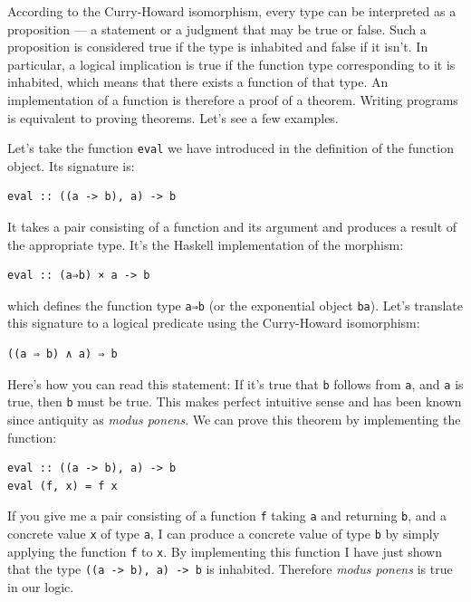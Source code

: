 According to the Curry-Howard isomorphism, every type can be interpreted
as a proposition --- a statement or a judgment that may be true or
false. Such a proposition is considered true if the type is inhabited
and false if it isn't. In particular, a logical implication is true if
the function type corresponding to it is inhabited, which means that
there exists a function of that type. An implementation of a function is
therefore a proof of a theorem. Writing programs is equivalent to
proving theorems. Let's see a few examples.

Let's take the function \texttt{eval} we have introduced in the
definition of the function object. Its signature is:

\begin{verbatim}
eval :: ((a -> b), a) -> b
\end{verbatim}

It takes a pair consisting of a function and its argument and produces a
result of the appropriate type. It's the Haskell implementation of the
morphism:

\begin{verbatim}
eval :: (a⇒b) × a -> b
\end{verbatim}

which defines the function type \texttt{a⇒b} (or the exponential object
\texttt{ba}). Let's translate this signature to a logical predicate
using the Curry-Howard isomorphism:

\begin{verbatim}
((a ⇒ b) ∧ a) ⇒ b
\end{verbatim}

Here's how you can read this statement: If it's true that \texttt{b}
follows from \texttt{a}, and \texttt{a} is true, then \texttt{b} must be
true. This makes perfect intuitive sense and has been known since
antiquity as \emph{modus ponens}. We can prove this theorem by
implementing the function:

\begin{verbatim}
eval :: ((a -> b), a) -> b
eval (f, x) = f x
\end{verbatim}

If you give me a pair consisting of a function \texttt{f} taking
\texttt{a} and returning \texttt{b}, and a concrete value \texttt{x} of
type \texttt{a}, I can produce a concrete value of type \texttt{b} by
simply applying the function \texttt{f} to \texttt{x}. By implementing
this function I have just shown that the type
\texttt{((a\ -\textgreater{}\ b),\ a)\ -\textgreater{}\ b} is inhabited.
Therefore \emph{modus ponens} is true in our logic.

